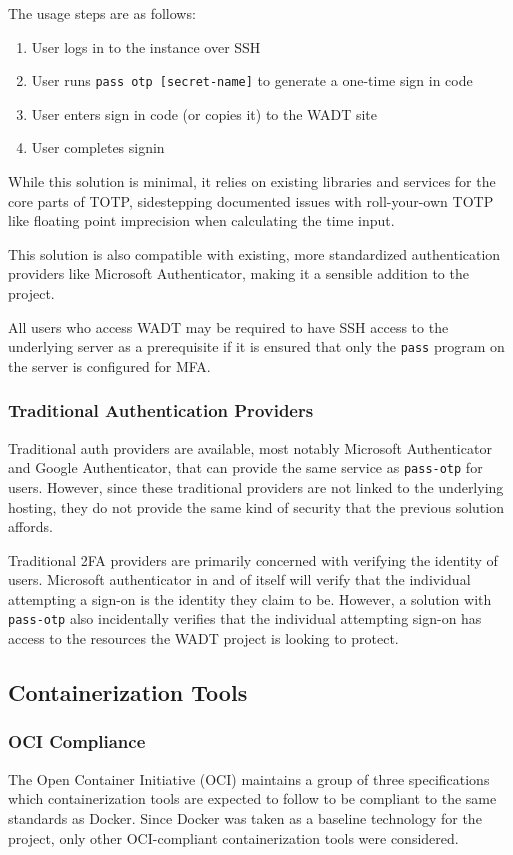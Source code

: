 \documentclass[12pt,titlepage]{article}
\begin{document}
The usage steps are as follows:
\begin{enumerate}
	\item User logs in to the instance over SSH
	\item User runs \texttt{pass otp [secret-name]} to generate a one-time sign in code
	\item User enters sign in code (or copies it) to the WADT site
	\item User completes signin
\end{enumerate}

While this solution is minimal, it relies on existing libraries and services for the core parts of TOTP, sidestepping documented issues with roll-your-own TOTP like floating point imprecision when calculating the time input.

This solution is also compatible with existing, more standardized authentication providers like Microsoft Authenticator, making it a sensible addition to the project.

All users who access WADT may be required to have SSH access to the underlying server as a prerequisite if it is ensured that only the \texttt{pass} program on the server is configured for MFA.


\subsubsection{Traditional Authentication Providers}
Traditional auth providers are available, most notably Microsoft Authenticator and Google Authenticator, that can provide the same service as \texttt{pass-otp} for users. However, since these traditional providers are not linked to the underlying hosting, they do not provide the same kind of security that the previous solution affords.

Traditional 2FA providers are primarily concerned with verifying the identity of users. Microsoft authenticator in and of itself will verify that the individual attempting a sign-on is the identity they claim to be. However, a solution with \texttt{pass-otp} also incidentally verifies that the individual attempting sign-on has access to the resources the WADT project is looking to protect.

\subsection{Containerization Tools}
\subsubsection{OCI Compliance}
The Open Container Initiative (OCI) maintains a group of three specifications which containerization tools are expected to follow to be compliant to the same standards as Docker. Since Docker was taken as a baseline technology for the project, only other OCI-compliant containerization tools were considered.
\end{document}
